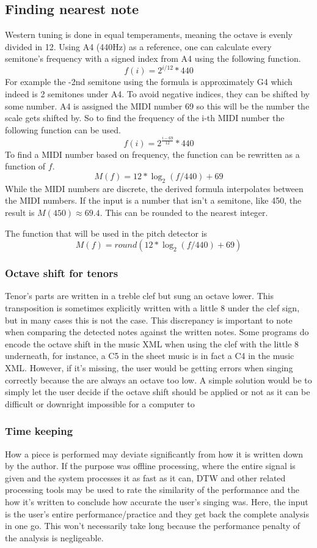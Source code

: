 \subsection{Finding nearest note}
Western tuning is done in equal temperaments, meaning the octave is evenly divided in 12. Using A4 (440Hz) as a reference, one can calculate every semitone's frequency with a signed index from A4 using the following function. 
$$f(i) = 2^{i/12}*440$$
For example the -2nd semitone using the formula is approximately G4 which indeed is 2 semitones under A4. To avoid negative indices, they can be shifted by some number. A4 is assigned the MIDI number 69 so this will be the number the scale gets shifted by. So to find the frequency of the i-th MIDI number the following function can be used.
$$f(i) = 2^{\frac{i-69}{12}}*440$$
To find a MIDI number based on frequency, the function can be rewritten as a function of $f$.
$$M(f) = 12*\log_2(f/440)+69$$
While the MIDI numbers are discrete, the derived formula interpolates between the MIDI numbers. If the input is a number that isn't a semitone, like 450, the result is $M(450) \approx 69.4$. This can be rounded to the nearest integer.

The function that will be used in the pitch detector is
$$M(f) = round(12*\log_2(f/440)+69)$$

\subsubsection{Octave shift for tenors}
Tenor's parts are written in a treble clef but sung an octave lower. This transposition is sometimes explicitly written with a little 8 under the clef sign, but in many cases this is not the case. This discrepancy is important to note when comparing the detected notes against the written notes. Some programs do encode the octave shift in the music XML when using the clef with the little 8 underneath, for instance, a C5 in the sheet music is in fact a C4 in the music XML. However, if it's missing, the user would be getting errors when singing correctly because the are always an octave too low. A simple solution would be to simply let the user decide if the octave shift should be applied or not as it can be difficult or downright impossible for a computer to 


\subsubsection{Time keeping}
How a piece is performed may deviate significantly from how it is written down by the author. If the purpose was offline processing, where the entire signal is given and the system processes it as fast as it can, DTW and other related processing tools may be used to rate the similarity of the performance and the how it's written to conclude how accurate the user's singing was. Here, the input is the user's entire performance/practice and they get back the complete analysis in one go. This won't necessarily take long because the performance penalty of the analysis is negligeable.

